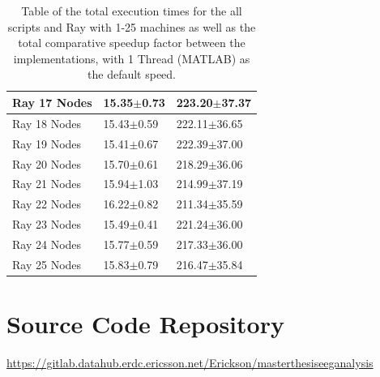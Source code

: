 \documentclass[12pt, a4paper]{article}
\begin{document}
\begin{appendices}
\begin{table}[H]
\begin{tabular}{|l|l|l|}
    Ray 17 Nodes       & 15.35$\pm$0.73     & 223.20$\pm$37.37 \\ \hline
    Ray 18 Nodes       & 15.43$\pm$0.59     & 222.11$\pm$36.65 \\ \hline
    Ray 19 Nodes       & 15.41$\pm$0.67     & 222.39$\pm$37.00 \\ \hline
    Ray 20 Nodes       & 15.70$\pm$0.61     & 218.29$\pm$36.06 \\ \hline
    Ray 21 Nodes       & 15.94$\pm$1.03     & 214.99$\pm$37.19 \\ \hline
    Ray 22 Nodes       & 16.22$\pm$0.82     & 211.34$\pm$35.59 \\ \hline
    Ray 23 Nodes       & 15.49$\pm$0.41     & 221.24$\pm$36.00 \\ \hline
    Ray 24 Nodes       & 15.77$\pm$0.59     & 217.33$\pm$36.00 \\ \hline
    Ray 25 Nodes       & 15.83$\pm$0.79     & 216.47$\pm$35.84 \\ \hline
    \end{tabular}

    \caption{Table of the total execution times for the all scripts and Ray with 1-25 machines as well as the total comparative speedup factor between the implementations, with 1 Thread (MATLAB) as the default speed.}
    \label{AppendixFullTimeExecSpeedup}
\end{table}


\section{Source Code Repository}

\url{https://gitlab.datahub.erdc.ericsson.net/Erickson/masterthesiseeganalysis}

\end{appendices}
\end{document}
